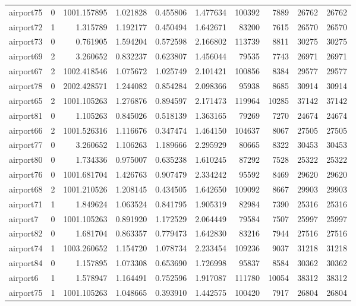 \begin{longtable}{|l|r|r|r|r|r|r|r|r|r|}
airport75 & 0 & 1001.157895 & 1.021828 & 0.455806 & 1.477634 & 100392 & 7889 & 26762 & 26762 \\
airport72 & 1 & 1.315789 & 1.192177 & 0.450494 & 1.642671 & 83200 & 7615 & 26570 & 26570 \\
airport73 & 0 & 0.761905 & 1.594204 & 0.572598 & 2.166802 & 113739 & 8811 & 30275 & 30275 \\
airport69 & 2 & 3.260652 & 0.832237 & 0.623807 & 1.456044 & 79535 & 7743 & 26971 & 26971 \\
airport67 & 2 & 1002.418546 & 1.075672 & 1.025749 & 2.101421 & 100856 & 8384 & 29577 & 29577 \\
airport78 & 0 & 2002.428571 & 1.244082 & 0.854284 & 2.098366 & 95938 & 8685 & 30914 & 30914 \\
airport65 & 2 & 1001.105263 & 1.276876 & 0.894597 & 2.171473 & 119964 & 10285 & 37142 & 37142 \\
airport81 & 0 & 1.105263 & 0.845026 & 0.518139 & 1.363165 & 79269 & 7270 & 24674 & 24674 \\
airport66 & 2 & 1001.526316 & 1.116676 & 0.347474 & 1.464150 & 104637 & 8067 & 27505 & 27505 \\
airport77 & 0 & 3.260652 & 1.106263 & 1.189666 & 2.295929 & 80665 & 8322 & 30453 & 30453 \\
airport80 & 0 & 1.734336 & 0.975007 & 0.635238 & 1.610245 & 87292 & 7528 & 25322 & 25322 \\
airport76 & 0 & 1001.681704 & 1.426763 & 0.907479 & 2.334242 & 95592 & 8469 & 29620 & 29620 \\
airport68 & 2 & 1001.210526 & 1.208145 & 0.434505 & 1.642650 & 109092 & 8667 & 29903 & 29903 \\
airport71 & 1 & 1.849624 & 1.063524 & 0.841795 & 1.905319 & 82984 & 7390 & 25316 & 25316 \\
airport7 & 0 & 1001.105263 & 0.891920 & 1.172529 & 2.064449 & 79584 & 7507 & 25997 & 25997 \\
airport82 & 0 & 1.681704 & 0.863357 & 0.779473 & 1.642830 & 83216 & 7944 & 27516 & 27516 \\
airport74 & 1 & 1003.260652 & 1.154720 & 1.078734 & 2.233454 & 109236 & 9037 & 31218 & 31218 \\
airport84 & 0 & 1.157895 & 1.073308 & 0.653690 & 1.726998 & 95837 & 8584 & 30362 & 30362 \\
airport6 & 1 & 1.578947 & 1.164491 & 0.752596 & 1.917087 & 111780 & 10054 & 38312 & 38312 \\
airport75 & 1 & 1001.105263 & 1.048665 & 0.393910 & 1.442575 & 100420 & 7917 & 26804 & 26804 \\

\end{longtable}
